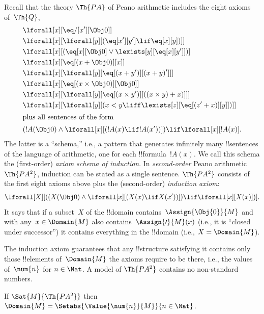 \documentclass[../../../include/open-logic-section]{subfiles}
\begin{document}


Recall that the theory $\Th{PA}$ of Peano arithmetic includes the
eight axioms of~$\Th{Q}$,
\begin{align*}
& \lforall[x][\eq/[x'][\Obj 0]]\\
& \lforall[x][\lforall[y][(\eq[x'][y'] \lif \eq[x][y])]]\\
& \lforall[x][(\eq[x][\Obj 0] \lor \lexists[y][\eq[x][y']])]\\ 
& \lforall[x][\eq[(x + \Obj 0)][x]]\\
& \lforall[x][\lforall[y][\eq[(x + y')][(x + y)']]]\\
& \lforall[x][\eq[(x \times \Obj 0)][\Obj 0]]\\
& \lforall[x][\lforall[y][\eq[(x \times y')][((x \times y) + x)]]]\\
& \lforall[x][\lforall[y][(x < y \liff \lexists[z][\eq[(z' + x)][y]])]]\\
\intertext{plus all sentences of the form}
& (!A(\Obj 0) \land \lforall[x][(!A(x) \lif !A(x'))]) \lif \lforall[x][!A(x)].
\end{align*}
The latter is a ``schema,'' i.e., a pattern that generates infinitely
many !!{sentence}s of the language of arithmetic, one for each
!!{formula}~$!A(x)$. We call this schema the (first-order)
\emph{axiom schema of induction}. 
In \emph{second-order} Peano arithmetic~$\Th{PA^2}$, induction
can be stated as a single sentence. $\Th{PA^2}$
consists of the first eight axioms above plus the (second-order)
\emph{induction axiom}:
\[
\lforall[X][((X(\Obj 0) \land \lforall[x][(X(x) \lif X(x'))]) \lif \lforall[x][X(x)])].
\]
It says that if a subset~$X$ of the !!{domain}
contains~$\Assign{\Obj{0}}{M}$ and with any~$x \in \Domain{M}$ also
contains~$\Assign{\prime}{M}(x)$ (i.e., it is ``closed under
successor'') it contains everything in the !!{domain} (i.e., $X =
\Domain{M}$).

The induction axiom guarantees that any !!{structure} satisfying it
contains only those !!{element}s of~$\Domain{M}$ the axioms require to
be there, i.e., the values of~$\num{n}$ for $n \in \Nat$. A model of
$\Th{PA^2}$ contains no non-standard numbers.

\begin{thm}
If $\Sat{M}{\Th{PA^2}}$ then $\Domain{M} =
\Setabs{\Value{\num{n}}{M}}{n \in \Nat}$.
\end{thm}
\end{document}

